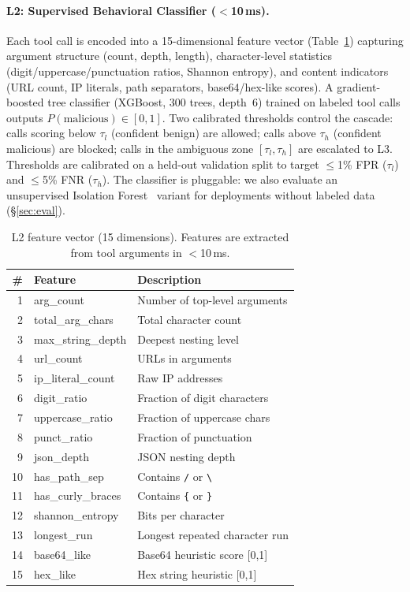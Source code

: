 \documentclass[sigconf,anonymous]{acmart}
\begin{document}
\paragraph{L2: Supervised Behavioral Classifier ($<$10\,ms).}
Each tool call is encoded into a 15-dimensional feature vector (Table~\ref{tab:features}) capturing argument structure (count, depth, length), character-level statistics (digit/uppercase/punctuation ratios, Shannon entropy), and content indicators (URL count, IP literals, path separators, base64/hex-like scores). A gradient-boosted tree classifier (XGBoost, 300 trees, depth~6) trained on labeled tool calls outputs $P(\text{malicious}) \in [0,1]$. Two calibrated thresholds control the cascade: calls scoring below $\tau_l$ (confident benign) are allowed; calls above $\tau_h$ (confident malicious) are blocked; calls in the ambiguous zone $[\tau_l, \tau_h]$ are escalated to L3. Thresholds are calibrated on a held-out validation split to target $\le$1\% FPR ($\tau_l$) and $\le$5\% FNR ($\tau_h$). The classifier is pluggable: we also evaluate an unsupervised Isolation Forest~\cite{zhao2019pyod} variant for deployments without labeled data (\S\ref{sec:eval}).

\begin{table}[t]
\centering
\footnotesize
\caption{L2 feature vector (15 dimensions). Features are extracted from tool arguments in $<$10\,ms.}
\vspace{-0.1in}
\label{tab:features}
\setlength{\tabcolsep}{3pt}
\begin{tabular}{rll}
\toprule
\# & Feature & Description \\
\midrule
1 & arg\_count & Number of top-level arguments \\
2 & total\_arg\_chars & Total character count \\
3 & max\_string\_depth & Deepest nesting level \\
4 & url\_count & URLs in arguments \\
5 & ip\_literal\_count & Raw IP addresses \\
6 & digit\_ratio & Fraction of digit characters \\
7 & uppercase\_ratio & Fraction of uppercase chars \\
8 & punct\_ratio & Fraction of punctuation \\
9 & json\_depth & JSON nesting depth \\
10 & has\_path\_sep & Contains \texttt{/} or \texttt{\textbackslash} \\
11 & has\_curly\_braces & Contains \texttt{\{} or \texttt{\}} \\
12 & shannon\_entropy & Bits per character \\
13 & longest\_run & Longest repeated character run \\
14 & base64\_like & Base64 heuristic score [0,1] \\
15 & hex\_like & Hex string heuristic [0,1] \\
\bottomrule
\end{tabular}
\vspace{-0.15in}
\end{table}
\end{document}
